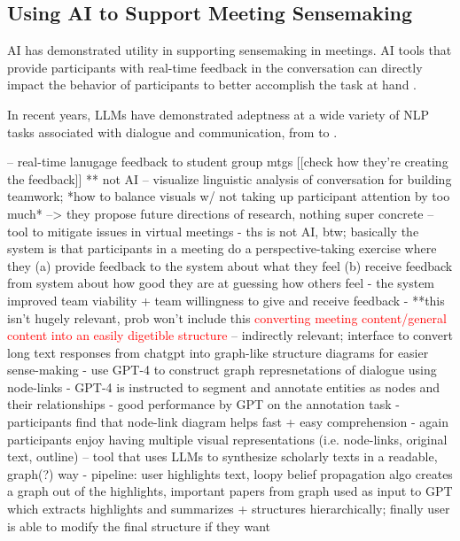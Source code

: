 \subsection{Using AI to Support Meeting Sensemaking}

AI has demonstrated utility in supporting sensemaking in meetings. AI tools that provide participants with real-time feedback in the conversation can directly impact the behavior of participants to better accomplish the task at hand \cite{leshedVisualizingRealtimeLanguagebased2009}. 

In recent years, LLMs have demonstrated adeptness at a wide variety of NLP tasks associated with dialogue and communication, from \cite{} to \cite{}. 


\cite{ImprovingTeamworkUsing} -- real-time lanugage feedback to student group mtgs [[check how they're creating the feedback]] ** not AI 
\cite{leshedVisualizingLanguageUse2010} -- visualize linguistic analysis of conversation for building teamwork; *how to balance visuals w/ not taking up participant attention by too much* --> they propose future directions of research, nothing super concrete
\cite{khadpeEmpathospherePromotingConstructive2022} -- tool to mitigate issues in virtual meetings
    - ths is not AI, btw; basically the system is that participants in a meeting do a perspective-taking exercise where they (a) provide feedback to the system about what they feel (b) receive feedback from system about how good they are at guessing how others feel
    - the system improved team viability + team willingness to give and receive feedback
    - **this isn't hugely relevant, prob won't include this
\textcolor{red}{converting meeting content/general content into an easily digetible structure}
\cite{Jiang2023GraphologueEL} -- indirectly relevant; interface to convert long text responses from chatgpt into graph-like structure diagrams for easier sense-making
    - use GPT-4 to construct graph represnetations of dialogue using node-links
    - GPT-4 is instructed to segment and annotate entities as nodes and their relationships
    - good performance by GPT on the annotation task
    - participants find that node-link diagram helps fast + easy comprehension
    - again participants enjoy having multiple visual representations (i.e. node-links, original text, outline) 
\cite{kangSynergiMixedInitiativeSystem2023} -- tool that uses LLMs to synthesize scholarly texts in a readable, graph(?) way
    - pipeline: user highlights text, loopy belief propagation algo creates a graph out of the highlights, important papers from graph used as input to GPT which extracts highlights and summarizes + structures hierarchically; finally user is able to modify the final structure if they want

